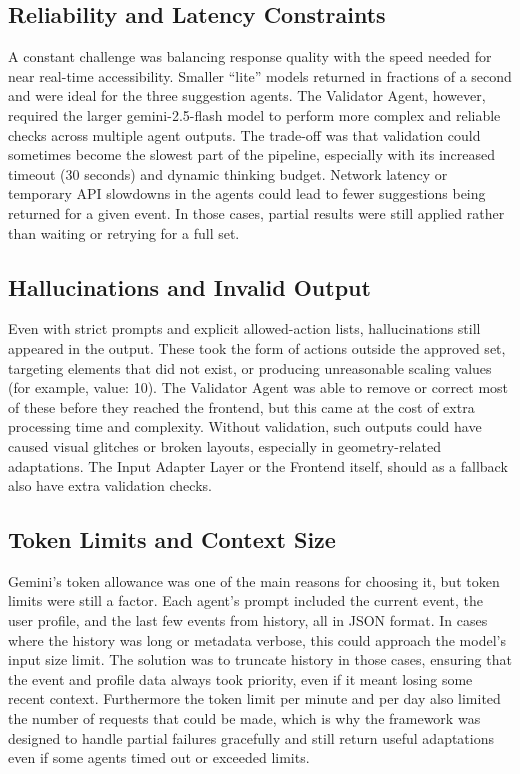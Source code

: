 \subsection{Reliability and Latency Constraints}
A constant challenge was balancing response quality with the speed needed for near real-time accessibility. Smaller “lite” models returned in fractions of a second and were ideal for the three suggestion agents. The Validator Agent, however, required the larger gemini-2.5-flash model to perform more complex and reliable checks across multiple agent outputs. The trade-off was that validation could sometimes become the slowest part of the pipeline, especially with its increased timeout (30 seconds) and dynamic thinking budget.
Network latency or temporary API slowdowns in the agents could lead to fewer suggestions being returned for a given event. In those cases, partial results were still applied rather than waiting or retrying for a full set.

\subsection{Hallucinations and Invalid Output}
Even with strict prompts and explicit allowed-action lists, hallucinations still appeared in the output. These took the form of actions outside the approved set, targeting elements that did not exist, or producing unreasonable scaling values (for example, value: 10). The Validator Agent was able to remove or correct most of these before they reached the frontend, but this came at the cost of extra processing time and complexity. Without validation, such outputs could have caused visual glitches or broken layouts, especially in geometry-related adaptations. The Input Adapter Layer or the Frontend itself, should as a fallback also have extra validation checks.

\subsection{Token Limits and Context Size}
Gemini’s token allowance was one of the main reasons for choosing it, but token limits were still a factor. Each agent’s prompt included the current event, the user profile, and the last few events from history, all in JSON format. In cases where the history was long or metadata verbose, this could approach the model’s input size limit. The solution was to truncate history in those cases, ensuring that the event and profile data always took priority, even if it meant losing some recent context. Furthermore the token limit per minute and per day also limited the number of requests that could be made, which is why the framework was designed to handle partial failures gracefully and still return useful adaptations even if some agents timed out or exceeded limits.

